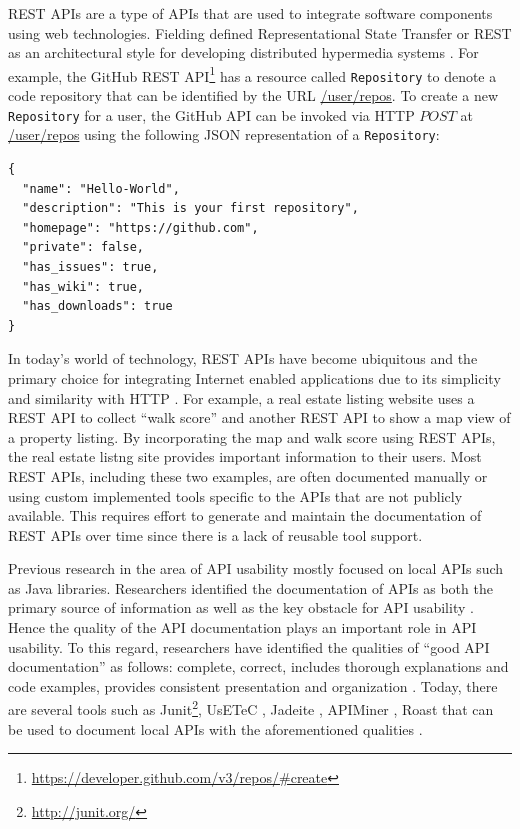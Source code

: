 \documentclass[12pt]{ucalgthes1}
\begin{document}
REST APIs are a type of APIs that are used to integrate software components using web technologies. Fielding defined Representational State Transfer or REST as an architectural style for developing distributed hypermedia systems \cite{Fielding_rest}. For example, the GitHub REST API\footnote{\url{https://developer.github.com/v3/repos/\#create}} has a resource called \texttt{Repository} to denote a code repository that can be identified by the URL \url{/user/repos}. To create a new \texttt{Repository} for a user, the GitHub API can be invoked via HTTP $POST$ at \url{/user/repos} using the following JSON representation of a \texttt{Repository}:

\begin{verbatim}
{
  "name": "Hello-World",
  "description": "This is your first repository",
  "homepage": "https://github.com",
  "private": false,
  "has_issues": true,
  "has_wiki": true,
  "has_downloads": true
}
\end{verbatim}

In today's world of technology, REST APIs have become ubiquitous and the primary choice for integrating Internet enabled applications due to its simplicity and similarity with HTTP \cite{mangler2010origin}. For example, a real estate listing website uses a REST API to collect ``walk score'' and another REST API to show a map view of a property listing. By incorporating the map and walk score using REST APIs, the real estate listng site provides important information to their users. Most REST APIs, including these two examples, are often documented manually or using custom implemented tools specific to the APIs that are not publicly available. This requires effort to generate and maintain the documentation of REST APIs over time since there is a lack of reusable tool support.

Previous research in the area of API usability mostly focused on local APIs such as Java libraries. Researchers identified the documentation of APIs as both the primary source of information as well as the key obstacle for API usability \cite{Robillard_what_makes}. Hence the quality of the API documentation plays an important role in API usability. To this regard, researchers have identified the qualities of ``good API documentation'' as follows: complete, correct, includes thorough explanations and code examples, provides consistent presentation and organization \cite{Robillard_what_makes,Myers_study}. Today, there are several tools such as Junit\footnote{\url{http://junit.org/}}, UsETeC \cite{zhu2014mining}, Jadeite \cite{Jadeite}, APIMiner \cite{montandon2013documenting}, Roast \cite{Hoffman_api_documentation} that can be used to document local APIs with the aforementioned qualities .
\end{document}

